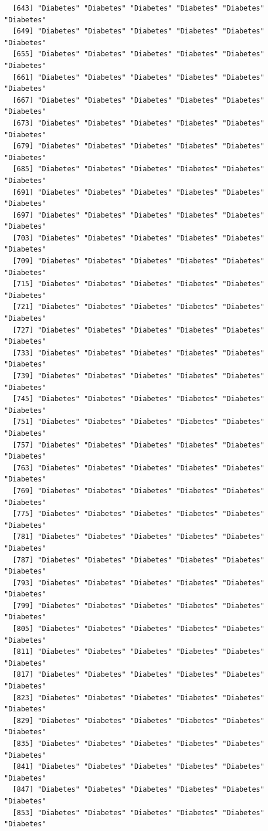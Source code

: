 \documentclass[
  letterpaper,
  DIV=11,
  numbers=noendperiod]{scrartcl}
\begin{document}
\begin{verbatim}
  [643] "Diabetes" "Diabetes" "Diabetes" "Diabetes" "Diabetes" "Diabetes"
  [649] "Diabetes" "Diabetes" "Diabetes" "Diabetes" "Diabetes" "Diabetes"
  [655] "Diabetes" "Diabetes" "Diabetes" "Diabetes" "Diabetes" "Diabetes"
  [661] "Diabetes" "Diabetes" "Diabetes" "Diabetes" "Diabetes" "Diabetes"
  [667] "Diabetes" "Diabetes" "Diabetes" "Diabetes" "Diabetes" "Diabetes"
  [673] "Diabetes" "Diabetes" "Diabetes" "Diabetes" "Diabetes" "Diabetes"
  [679] "Diabetes" "Diabetes" "Diabetes" "Diabetes" "Diabetes" "Diabetes"
  [685] "Diabetes" "Diabetes" "Diabetes" "Diabetes" "Diabetes" "Diabetes"
  [691] "Diabetes" "Diabetes" "Diabetes" "Diabetes" "Diabetes" "Diabetes"
  [697] "Diabetes" "Diabetes" "Diabetes" "Diabetes" "Diabetes" "Diabetes"
  [703] "Diabetes" "Diabetes" "Diabetes" "Diabetes" "Diabetes" "Diabetes"
  [709] "Diabetes" "Diabetes" "Diabetes" "Diabetes" "Diabetes" "Diabetes"
  [715] "Diabetes" "Diabetes" "Diabetes" "Diabetes" "Diabetes" "Diabetes"
  [721] "Diabetes" "Diabetes" "Diabetes" "Diabetes" "Diabetes" "Diabetes"
  [727] "Diabetes" "Diabetes" "Diabetes" "Diabetes" "Diabetes" "Diabetes"
  [733] "Diabetes" "Diabetes" "Diabetes" "Diabetes" "Diabetes" "Diabetes"
  [739] "Diabetes" "Diabetes" "Diabetes" "Diabetes" "Diabetes" "Diabetes"
  [745] "Diabetes" "Diabetes" "Diabetes" "Diabetes" "Diabetes" "Diabetes"
  [751] "Diabetes" "Diabetes" "Diabetes" "Diabetes" "Diabetes" "Diabetes"
  [757] "Diabetes" "Diabetes" "Diabetes" "Diabetes" "Diabetes" "Diabetes"
  [763] "Diabetes" "Diabetes" "Diabetes" "Diabetes" "Diabetes" "Diabetes"
  [769] "Diabetes" "Diabetes" "Diabetes" "Diabetes" "Diabetes" "Diabetes"
  [775] "Diabetes" "Diabetes" "Diabetes" "Diabetes" "Diabetes" "Diabetes"
  [781] "Diabetes" "Diabetes" "Diabetes" "Diabetes" "Diabetes" "Diabetes"
  [787] "Diabetes" "Diabetes" "Diabetes" "Diabetes" "Diabetes" "Diabetes"
  [793] "Diabetes" "Diabetes" "Diabetes" "Diabetes" "Diabetes" "Diabetes"
  [799] "Diabetes" "Diabetes" "Diabetes" "Diabetes" "Diabetes" "Diabetes"
  [805] "Diabetes" "Diabetes" "Diabetes" "Diabetes" "Diabetes" "Diabetes"
  [811] "Diabetes" "Diabetes" "Diabetes" "Diabetes" "Diabetes" "Diabetes"
  [817] "Diabetes" "Diabetes" "Diabetes" "Diabetes" "Diabetes" "Diabetes"
  [823] "Diabetes" "Diabetes" "Diabetes" "Diabetes" "Diabetes" "Diabetes"
  [829] "Diabetes" "Diabetes" "Diabetes" "Diabetes" "Diabetes" "Diabetes"
  [835] "Diabetes" "Diabetes" "Diabetes" "Diabetes" "Diabetes" "Diabetes"
  [841] "Diabetes" "Diabetes" "Diabetes" "Diabetes" "Diabetes" "Diabetes"
  [847] "Diabetes" "Diabetes" "Diabetes" "Diabetes" "Diabetes" "Diabetes"
  [853] "Diabetes" "Diabetes" "Diabetes" "Diabetes" "Diabetes" "Diabetes"

\end{verbatim}
\end{document}
